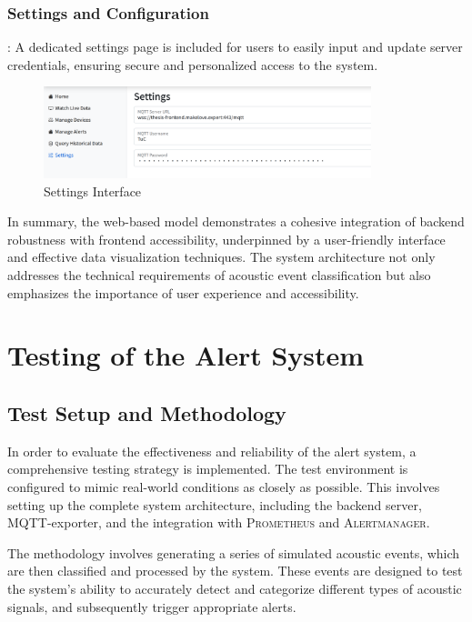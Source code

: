 \subsubsection{Settings and Configuration}: A dedicated settings page is included for users to easily input and update server credentials, ensuring secure and personalized access to the system.

\begin{figure}[htbp]
  \centering
  \includegraphics[width=0.85\textwidth]{Pictures/settings}
  \caption{\label{fig:settings}Settings Interface}
\end{figure}


In summary, the web-based model demonstrates a cohesive integration of backend robustness with frontend accessibility, underpinned by a user-friendly interface and effective data visualization techniques. The system architecture not only addresses the technical requirements of acoustic event classification but also emphasizes the importance of user experience and accessibility.

\section{Testing of the Alert System}
\subsection{Test Setup and Methodology}
In order to evaluate the effectiveness and reliability of the alert system, a comprehensive testing strategy is implemented. The test environment is configured to mimic real-world conditions as closely as possible. This involves setting up the complete system architecture, including the backend server, MQTT-exporter, and the integration with \textsc{Prometheus} and \textsc{Alertmanager}.

The methodology involves generating a series of simulated acoustic events, which are then classified and processed by the system. These events are designed to test the system's ability to accurately detect and categorize different types of acoustic signals, and subsequently trigger appropriate alerts.

